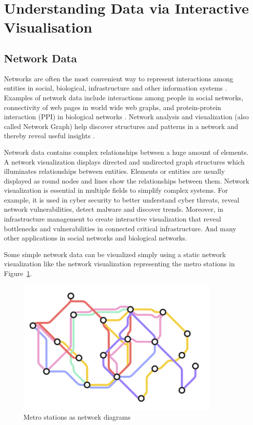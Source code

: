 \section{Understanding Data via Interactive Visualisation}
\subsection{Network Data}


Networks are often the most convenient way to represent interactions among entities in social, biological, infrastructure and other information systems \cite{becker1995visualizing, herman2000graph}. 
Examples of network data include interactions among people in social networks, connectivity of web pages in world wide web graphs, and protein-protein interaction (PPI) in biological networks \cite{leskovec2014snap, arifuzzaman2017scalable}. 
Network analysis and visualization (also called Network Graph) help discover structures and patterns in a network and thereby reveal useful insights \cite{herman2000graph, arifuzzaman2015space, arifuzzaman2012patric, arifuzzaman2017scalable, arifuzzaman2015fast}.

Network data contains complex relationships between a huge amount of elements. A network visualization displays directed and undirected graph structures which illuminates relationships between entities. Elements or entities are usually displayed as round nodes and lines show the relationships between them. Network visualization is essential in multiple fields to simplify complex systems. For example, it is used in cyber security to better understand cyber threats, reveal network vulnerabilities, detect malware and discover trends. Moreover, in infrastructure management to create interactive visualization that reveal bottlenecks and vulnerabilities in connected critical infrastructure. And many other applications in social networks and biological networks. 


Some simple network data can be visualized simply using a static network visualization like the network visualization representing the metro stations in Figure~\ref{fig:metro}.

\begin{figure}[H]
\centering
\captionsetup{justification=centering}
\includegraphics[width=0.9\textwidth]{./pics/network1.png}
\caption{Metro stations as network diagrams \cite{metro} }
\label{fig:metro}
\end{figure}

